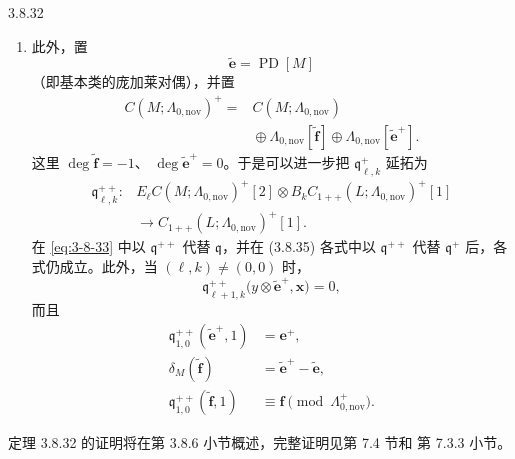 \begin{theorem}{3.8.32}
\begin{enumerate}[label=\textup{(\arabic*)},leftmargin=2.8em]
  \item 此外，置
  \[
   \widetilde{\mathbf e}=\operatorname{PD}[M]
  \]
  （即基本类的庞加莱对偶），并置
  \[
  \begin{aligned}
   C(M;\Lambda_{0,\mathrm{nov}})^+
   ={}&C(M;\Lambda_{0,\mathrm{nov}})\\
   &{}\oplus
   \Lambda_{0,\mathrm{nov}}[\widetilde{\mathbf f}]
   \oplus
   \Lambda_{0,\mathrm{nov}}[\widetilde{\mathbf e}^+].
  \end{aligned}
  \]
  这里
  $\deg\widetilde{\mathbf f}=-1$、
  $\deg\widetilde{\mathbf e}^+=0$。于是可以进一步把
  $\mathfrak q^+_{\ell,k}$ 延拓为
  \[
  \begin{aligned}
   \mathfrak q^{++}_{\ell,k}\colon{}&
   E_\ell C(M;\Lambda_{0,\mathrm{nov}})^+[2]
   \otimes
   B_kC_{1++}(L;\Lambda_{0,\mathrm{nov}})^+[1]\\
   &\longrightarrow
   C_{1++}(L;\Lambda_{0,\mathrm{nov}})^+[1].
  \end{aligned}
  \]
  在 \eqref{eq:3-8-33} 中以 $\mathfrak q^{++}$ 代替
  $\mathfrak q$，并在 (3.8.35) 各式中以 $\mathfrak q^{++}$ 代替
  $\mathfrak q^+$ 后，各式仍成立。此外，当
  $(\ell,k)\ne(0,0)$ 时，
  \begin{equation}
   \mathfrak q^{++}_{\ell+1,k}
   \bigl(y\otimes\widetilde{\mathbf e}^+,\mathbf x\bigr)=0,
  \tag{3.8.36.1}\label{eq:3-8-36-1}
  \end{equation}
  而且
  \begin{align}
   \mathfrak q^{++}_{1,0}
   (\widetilde{\mathbf e}^+,1)
   &=\mathbf e^+,
   \tag{3.8.36.2}\label{eq:3-8-36-2}\\
   \delta_M(\widetilde{\mathbf f})
   &=\widetilde{\mathbf e}^+-\widetilde{\mathbf e},
   \tag{3.8.36.3}\label{eq:3-8-36-3}\\
   \mathfrak q^{++}_{1,0}
   (\widetilde{\mathbf f},1)
   &\equiv\mathbf f\pmod{\Lambda^+_{0,\mathrm{nov}}}.
   \tag{3.8.36.4}\label{eq:3-8-36-4}
  \end{align}
\end{enumerate}
\end{theorem}

定理 3.8.32 的证明将在第 3.8.6 小节概述，完整证明见第 7.4 节和
第 7.3.3 小节。

